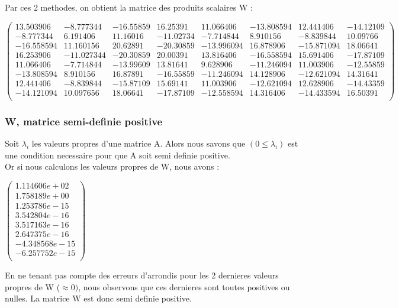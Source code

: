 \documentclass[a4paper,11pt]{article}
\begin{document}
Par ces 2 methodes, on obtient la matrice des produits scalaires W : 
\begin{center}
$\begin{pmatrix}
13.503906&-8.777344&-16.55859&16.25391&11.066406&-13.808594&12.441406&-14.12109\\
-8.777344&6.191406&11.16016&-11.02734&-7.714844&8.910156&-8.839844&10.09766\\
-16.558594&11.160156&20.62891&-20.30859&-13.996094&16.878906&-15.871094&18.06641\\
16.253906&-11.027344&-20.30859&20.00391&13.816406&-16.558594&15.691406&-17.87109\\
11.066406&-7.714844&-13.99609&13.81641&9.628906&-11.246094&11.003906&-12.55859\\
-13.808594&8.910156&16.87891&-16.55859&-11.246094&14.128906&-12.621094&14.31641\\
12.441406&-8.839844&-15.87109&15.69141&11.003906&-12.621094&12.628906&-14.43359\\
-14.121094&10.097656&18.06641&-17.87109&-12.558594&14.316406&-14.433594&16.50391\\
\end{pmatrix}$
\end{center}

\subsubsection{W, matrice semi-definie positive}

\noindent Soit $\lambda_i$ les valeurs propres d'une matrice A. Alors nous savons que $(0 \le \lambda_i)$ est une condition necessaire pour que A soit semi definie positive.\\

\noindent Or si nous calculons les valeurs propres de W, nous avons :
\begin{center}
$\begin{pmatrix}
1.114606e+02\\
1.758189e+00\\
1.253786e-15\\
3.542804e-16\\
3.517163e-16\\
2.647375e-16\\
-4.348568e-15\\
-6.257752e-15\\
\end{pmatrix}$
\end{center}
\noindent En ne tenant pas compte des erreurs d'arrondis pour les 2 dernieres valeurs propres de W ($\approx 0)$, nous observons que ces dernieres sont toutes positives ou nulles. La matrice W est donc semi definie positive.
\end{document}
